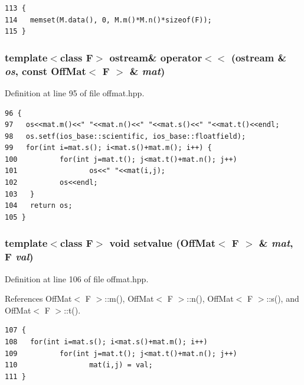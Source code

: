 \footnotesize\begin{verbatim}113 {
114   memset(M.data(), 0, M.m()*M.n()*sizeof(F));
115 }
\end{verbatim}\normalsize 


\subsubsection{\setlength{\rightskip}{0pt plus 5cm}template$<$class F$>$ ostream\& operator$<$$<$ (ostream \& {\em os}, const {\bf Off\-Mat}$<$ F $>$ \& {\em mat})\hspace{0.3cm}{\tt  [inline]}}\label{offmat_8hpp_c6f3af144ec538f4d752dfdff8cb176d_c6f3af144ec538f4d752dfdff8cb176d}




Definition at line 95 of file offmat.hpp.

\footnotesize\begin{verbatim}96 {
97   os<<mat.m()<<" "<<mat.n()<<" "<<mat.s()<<" "<<mat.t()<<endl;
98   os.setf(ios_base::scientific, ios_base::floatfield);
99   for(int i=mat.s(); i<mat.s()+mat.m(); i++) {
100          for(int j=mat.t(); j<mat.t()+mat.n(); j++)
101                 os<<" "<<mat(i,j);
102          os<<endl;
103   }
104   return os;
105 }
\end{verbatim}\normalsize 


\subsubsection{\setlength{\rightskip}{0pt plus 5cm}template$<$class F$>$ void setvalue ({\bf Off\-Mat}$<$ F $>$ \& {\em mat}, F {\em val})\hspace{0.3cm}{\tt  [inline]}}\label{offmat_8hpp_eadb59a478e7e1e6eb7ebd3d1ffac460_eadb59a478e7e1e6eb7ebd3d1ffac460}




Definition at line 106 of file offmat.hpp.

References Off\-Mat$<$ F $>$::m(), Off\-Mat$<$ F $>$::n(), Off\-Mat$<$ F $>$::s(), and Off\-Mat$<$ F $>$::t().

\footnotesize\begin{verbatim}107 {
108   for(int i=mat.s(); i<mat.s()+mat.m(); i++)
109          for(int j=mat.t(); j<mat.t()+mat.n(); j++)
110                 mat(i,j) = val;
111 }
\end{verbatim}\normalsize 


